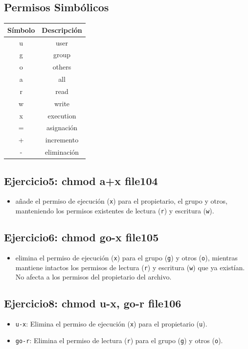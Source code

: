 \documentclass[11pt,twoside]{book}
\begin{document}
    \subsection*{Permisos Simbólicos}
        \begin{center}
        \begin{tabular}{|c|c|}
        \hline
        \textbf{Símbolo} & \textbf{Descripción} \\
        \hline
        u & user \\
        g & group \\
        o & others \\
        a & all \\
        r & read \\
        w & write \\
        x & execution \\
        = & asignación \\
        + & incremento \\
        - & eliminación \\
        \hline
        \end{tabular}
        \end{center}
        \subsection*{Ejercicio5: chmod a+x file104}
        \begin{itemize}
          \item añade el permiso de ejecución (\verb|x|) para el propietario, el grupo y otros,         manteniendo los permisos existentes de lectura (\verb|r|) y escritura (\verb|w|). 
\end{itemize}

        \subsection*{Ejercicio6: chmod go-x file105}
        \begin{itemize}
          \item elimina el permiso de ejecución (\verb|x|) para el grupo (\verb|g|) y otros (\verb|o|), mientras mantiene intactos los permisos de lectura (\verb|r|) y escritura (\verb|w|) que ya existían. No afecta a los permisos del propietario del archivo. 
        \end{itemize}
        
        \subsection*{Ejercicio8: chmod u-x, go-r file106}
        \begin{itemize}
          \item \verb|u-x|: Elimina el permiso de ejecución (\verb|x|) para el propietario (\verb|u|). 
          \item \verb|go-r|: Elimina el permiso de lectura (\verb|r|) para el grupo (\verb|g|) y otros (\verb|o|). 
        \end{itemize}
\end{document}
